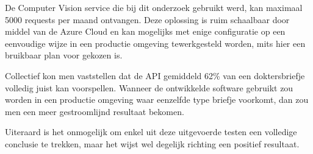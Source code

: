 De Computer Vision service die bij dit onderzoek gebruikt werd, kan maximaal 5000 requests per maand ontvangen. Deze oplossing is ruim schaalbaar door middel van de Azure Cloud en kan mogelijks met enige configuratie op een eenvoudige wijze in een productie omgeving tewerkgesteld worden, mits hier een bruikbaar plan voor gekozen is. 


Collectief kon men vaststellen dat de API gemiddeld 62\% van een doktersbriefje volledig juist kan voorspellen. Wanneer de ontwikkelde software gebruikt zou worden in een productie omgeving waar eenzelfde type briefje voorkomt, dan zou men een meer gestroomlijnd resultaat bekomen. 


Uiteraard is het onmogelijk om enkel uit deze uitgevoerde testen een volledige conclusie te trekken, maar het wijst wel degelijk richting een positief resultaat. 







